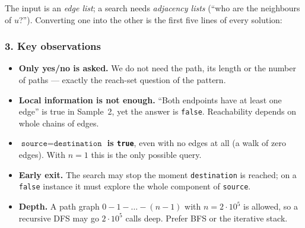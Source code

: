 The input is an \emph{edge list}; a search needs \emph{adjacency lists} (``who are the neighbours of $u$?''). Converting one into the other is the first five lines of every solution:

\begin{diagrambox}
\end{diagrambox}

\subsubsection*{3. Key observations}

\begin{itemize}[leftmargin=*]
    \item \textbf{Only yes/no is asked.} We do not need the path, its length or the number of paths --- exactly the reach-set question of the pattern.
    \item \textbf{Local information is not enough.} ``Both endpoints have at least one edge'' is true in Sample~2, yet the answer is \texttt{false}. Reachability depends on whole chains of edges.
    \item \textbf{$\texttt{source} = \texttt{destination}$ is \texttt{true}}, even with no edges at all (a walk of zero edges). With $n = 1$ this is the only possible query.
    \item \textbf{Early exit.} The search may stop the moment \texttt{destination} is reached; on a \texttt{false} instance it must explore the whole component of \texttt{source}.
    \item \textbf{Depth.} A path graph $0 - 1 - \dots - (n{-}1)$ with $n = 2\cdot10^5$ is allowed, so a recursive DFS may go $2\cdot10^5$ calls deep. Prefer BFS or the iterative stack.
\end{itemize}

